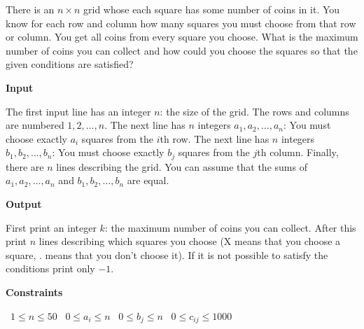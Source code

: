 There is an $n \times n$ grid whose each square has some number of coins in it.
You know for each row and column how many squares you must choose from that row or column. You get all coins from every square you choose. What is the maximum number of coins you can collect and how could you choose the squares so that the given conditions are satisfied?

\vspace{0.3cm}\noindent\textbf{Input}

The first input line has an integer $n$: the size of the grid. The rows and columns are numbered $1,2,\dots,n$.
The next line has $n$ integers $a_1,a_2,\ldots,a_n$: You must choose exactly $a_i$ squares from the $i$th row.
The next line has $n$ integers $b_1,b_2,\ldots,b_n$: You must choose exactly $b_j$ squares from the $j$th column.
Finally, there are $n$ lines describing the grid. You can assume that the sums of $a_1,a_2,\ldots,a_n$ and $b_1,b_2,\ldots,b_n$ are equal.

\vspace{0.3cm}\noindent\textbf{Output}

First print an integer $k$: the maximum number of coins you can collect. After this print $n$ lines describing which squares you choose (X means that you choose a square, . means that you don't choose it).
If it is not possible to satisfy the conditions print only $-1$.

\vspace{0.3cm}\noindent\textbf{Constraints}

\textbullet\ $1 \le n \le 50$
\textbullet\ $0 \le a_i \le n$
\textbullet\ $0 \le b_j \le n$
\textbullet\ $0 \le c_{ij} \le 1000$